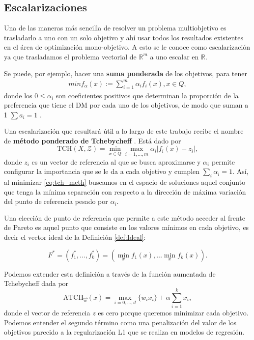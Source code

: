 \subsection{Escalarizaciones} \label{sec:Escalarizaciones}

Una de las maneras más sencilla de resolver un problema multiobjetivo es trasladarlo a uno con un solo objetivo y ahí usar todos los resultados existentes en el área de optimización mono-objetivo. A esto se le conoce como escalarización ya que trasladamos el problema vectorial de $\mathbb{R}^m$ a uno escalar en $\mathbb{R}$.

Se puede, por ejemplo, hacer una \textbf{suma ponderada} \cite{zadehOptimalityNonscalarvaluedPerformance1963} de los objetivos, para tener
\begin{align} \label{eq:suma_ponderada}
    min f_\alpha(x):=\sum_{i=1}^m \alpha_i f_i(x), x\in Q,
\end{align}
donde los $0\leq \alpha_i$ son coeficientes positivos que determinan la proporción de la preferencia que tiene el DM por cada uno de los objetivos, de modo que suman a 1 $\sum a_i=1$ . 

Una escalarización que resultará útil a lo largo de este trabajo recibe el nombre de \textbf{método ponderado de Tchebycheff} \cite{bowmanRelationshipTchebycheffNorm1976}. Está dado por
\begin{equation} \label{eq:tch_meth}
    \text{TCH}(X,\mathcal{Z}) = \min_{x\in Q} \max_{i=1,\ldots,m} \alpha_i |f_i(x)-z_i|,
\end{equation}
donde $z_i$ es un vector de referencia al que se busca aproximarse y $\alpha_i$ permite configurar la importancia  que se le da a cada objetivo y cumplen $\sum_i \alpha_i = 1$. Así, al minimizar \ref{eq:tch_meth}  buscamos en el espacio de soluciones aquel conjunto que tenga la mínima separación con respecto a la dirección de máxima variación del punto de referencia pesado por $\alpha_i$. 

Una elección de punto de referencia  que permite a este método acceder al frente de Pareto es aquel punto que consiste en los valores mínimos en cada objetivo, es decir el vector ideal de la Definición \ref{def:Ideal}:

\begin{equation} \label{eq:vector_utopico}
    F^*=(f_1^*,\ldots,f_k^*)=(\min_x f_1(x), \ldots \min_x f_k(x)). \nonumber
\end{equation}

Podemos extender esta definición a través de la función aumentada de Tchebycheff \cite{TCHEB} dada por
\begin{equation} \label{eq:tchebychev}
    \text{ATCH}_{\vec{w}}(x)=\max_{i=0,\ldots,d} \{w_ix_i\}+\alpha \sum_{i=1}^k x_i   ,
\end{equation}
donde el vector de referencia $z$  es cero porque queremos minimizar cada objetivo. Podemos entender el segundo término como una penalización del valor de los objetivos parecido a la regularización L1 que se realiza en modelos de regresión.


